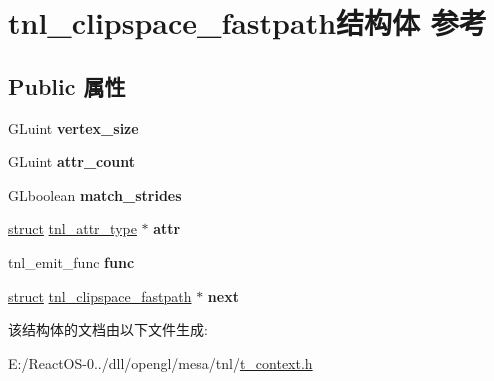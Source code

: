 \hypertarget{structtnl__clipspace__fastpath}{}\section{tnl\+\_\+clipspace\+\_\+fastpath结构体 参考}
\label{structtnl__clipspace__fastpath}
\subsection*{Public 属性}
\begin{DoxyCompactItemize}
\item 
\mbox{\label{structtnl__clipspace__fastpath_a596c7276b806598f47e46d3298a570df}} 
G\+Luint {\bfseries vertex\+\_\+size}
\item 
\mbox{\label{structtnl__clipspace__fastpath_adfe31fce7e5d3712a233caf51f95bf37}} 
G\+Luint {\bfseries attr\+\_\+count}
\item 
\mbox{\label{structtnl__clipspace__fastpath_ae89a0d06523b9a86cccd4e7d4fa0c596}} 
G\+Lboolean {\bfseries match\+\_\+strides}
\item 
\mbox{\label{structtnl__clipspace__fastpath_a60835604ba46dba006a36857e4b5cbf2}} 
\hyperlink{interfacestruct}{struct} \hyperlink{structtnl__attr__type}{tnl\+\_\+attr\+\_\+type} $\ast$ {\bfseries attr}
\item 
\mbox{\label{structtnl__clipspace__fastpath_a64f2ade7c9c8e6bee59e11d9b769e202}} 
tnl\+\_\+emit\+\_\+func {\bfseries func}
\item 
\mbox{\label{structtnl__clipspace__fastpath_a5d46901dc94c23b1f495cf6c96f9c91e}} 
\hyperlink{interfacestruct}{struct} \hyperlink{structtnl__clipspace__fastpath}{tnl\+\_\+clipspace\+\_\+fastpath} $\ast$ {\bfseries next}
\end{DoxyCompactItemize}


该结构体的文档由以下文件生成\+:\begin{DoxyCompactItemize}
\item 
E\+:/\+React\+O\+S-\/0../dll/opengl/mesa/tnl/\hyperlink{t__context_8h}{t\+\_\+context.\+h}\end{DoxyCompactItemize}
